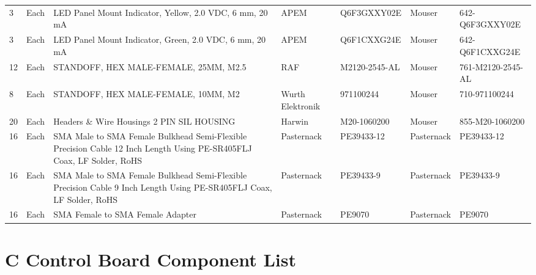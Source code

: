 \documentclass[12pt,a4paper,oneside]{article}
\begin{document}
\begin{landscape}
\begin{table}[H]
{\begin{tabular}{@{}lllllll@{}}
3 & Each & LED Panel Mount Indicator, Yellow, 2.0 VDC, 6 mm, 20 mA & APEM & Q6F3GXXY02E & Mouser & 642-Q6F3GXXY02E\\
3 & Each & LED Panel Mount Indicator, Green, 2.0 VDC, 6 mm, 20 mA & APEM & Q6F1CXXG24E & Mouser & 642-Q6F1CXXG24E\\
12 & Each & STANDOFF, HEX MALE-FEMALE, 25MM, M2.5 & RAF & M2120-2545-AL & Mouser & 761-M2120-2545-AL\\
8 & Each & STANDOFF, HEX MALE-FEMALE, 10MM, M2 & Wurth Elektronik & 971100244 & Mouser & 710-971100244\\
20 & Each & Headers \& Wire Housings 2 PIN SIL HOUSING & Harwin & M20-1060200 & Mouser & 855-M20-1060200\\
16 & Each & SMA Male to SMA Female Bulkhead Semi-Flexible Precision Cable 12 Inch Length Using PE-SR405FLJ Coax, LF Solder, RoHS & Pasternack & PE39433-12 & Pasternack & PE39433-12\\
16 & Each & SMA Male to SMA Female Bulkhead Semi-Flexible Precision Cable 9 Inch Length Using PE-SR405FLJ Coax, LF Solder, RoHS & Pasternack & PE39433-9 & Pasternack & PE39433-9\\
16 & Each & SMA Female to SMA Female Adapter & Pasternack & PE9070 & Pasternack & PE9070\\

\bottomrule            
\end{tabular}}
\label{tab:Attemp_components}
\end{table}

\newpage


\section*{C \hspace{.5cm} Control Board Component List}


\begin{table}[H]
\centering
{}
\end{table}
\end{landscape}
\end{document}
